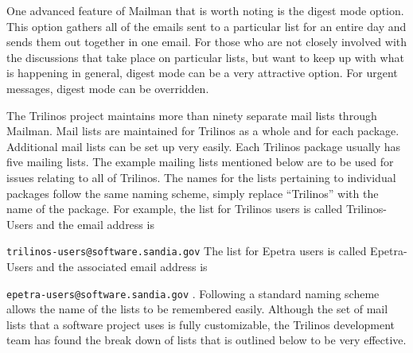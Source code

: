 \documentclass[12pt,relax]{article}
\newcommand{\InlineCommand}[1]{
  {\hspace{0.01 in}} {\tt #1} {\hspace{0.01 in}}}
\begin{document}
One advanced feature of Mailman that is worth noting is the digest mode option.
This option gathers all of the emails sent to a particular list for an entire 
day and sends them out together in one email.  For those who are not closely 
involved with the discussions that take place on particular lists, but want to 
keep up with what is happening in general, digest mode can be a very 
attractive option.  For urgent messages, digest mode can 
be overridden.

The Trilinos project maintains more than ninety separate mail lists through 
Mailman.  Mail lists are maintained for Trilinos as a whole and for each 
package.  Additional mail lists can be set up very easily.  Each Trilinos 
package usually has five mailing lists.  The example mailing lists mentioned 
below are to be used for issues relating to all of Trilinos.  
The names for the lists pertaining to individual packages follow the same 
naming scheme, simply replace ``Trilinos'' with the name of the package.  For example, the list for Trilinos users is 
called Trilinos-Users and the email address is 
\InlineCommand{trilinos-users@software.sandia.gov}  The list 
for Epetra users is called Epetra-Users and the associated email address is 
\InlineCommand{epetra-users@software.sandia.gov}.  Following a standard naming
scheme allows the name of the lists to be remembered easily.  Although the 
set of mail lists that a software project uses is fully customizable, the 
Trilinos development team has found the break down of lists that is outlined 
below to be very effective.
\end{document}
